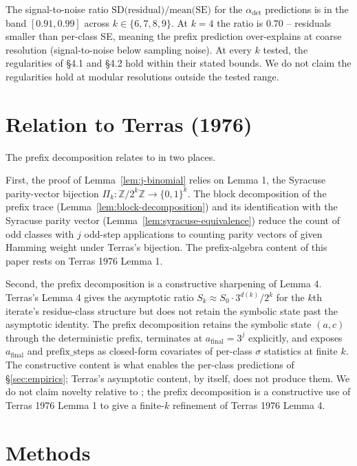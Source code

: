 \documentclass[pdflatex,sn-mathphys-num]{sn-jnl}
\theoremstyle{thmstyleone}%
\theoremstyle{definition}
\theoremstyle{plain}
\begin{document}
The signal-to-noise ratio $\text{SD(residual)}/ \text{mean(SE)}$ for the $\alpha_{\text{det}}$ predictions is in the band $[0.91, 0.99]$ across $k \in \{6, 7, 8, 9\}$. At $k=4$ the ratio is $0.70$ -- residuals smaller than per-class SE, meaning the prefix prediction over-explains at coarse resolution (signal-to-noise below sampling noise). At every $k$ tested, the regularities of \S4.1 and \S4.2 hold within their stated bounds. We do not claim the regularities hold at modular resolutions outside the tested range.

\section{Relation to Terras (1976)}
\label{sec:terras-relation}
The prefix decomposition relates to \citet{terras1976} in two places.

First, the proof of Lemma~\ref{lem:j-binomial} relies on \citet{terras1976} Lemma 1, the Syracuse parity-vector bijection $\Pi_k \colon \mathbb{Z}/2^k\mathbb{Z} \to \{0,1\}^k$. The block decomposition of the prefix trace (Lemma~\ref{lem:block-decomposition}) and its identification with the Syracuse parity vector (Lemma~\ref{lem:syracuse-equivalence}) reduce the count of odd classes with $j$ odd-step applications to counting parity vectors of given Hamming weight under Terras's bijection. The prefix-algebra content of this paper rests on Terras 1976 Lemma 1.

Second, the prefix decomposition is a constructive sharpening of \citet{terras1976} Lemma 4. Terras's Lemma 4 gives the asymptotic ratio $S_k \approx S_0 \cdot 3^{d(k)}/2^k$ for the $k$th iterate's residue-class structure but does not retain the symbolic state past the asymptotic identity. The prefix decomposition retains the symbolic state $(a, c)$ through the deterministic prefix, terminates at $a_{\text{final}} = 3^j$ explicitly, and exposes $a_{\text{final}}$ and $\text{prefix\_steps}$ as closed-form covariates of per-class $\sigma$ statistics at finite $k$. The constructive content is what enables the per-class predictions of \S\ref{sec:empirics}; Terras's asymptotic content, by itself, does not produce them. We do not claim novelty relative to \citet{terras1976}; the prefix decomposition is a constructive use of Terras 1976 Lemma 1 to give a finite-$k$ refinement of Terras 1976 Lemma 4.

\section{Methods}
\end{document}
